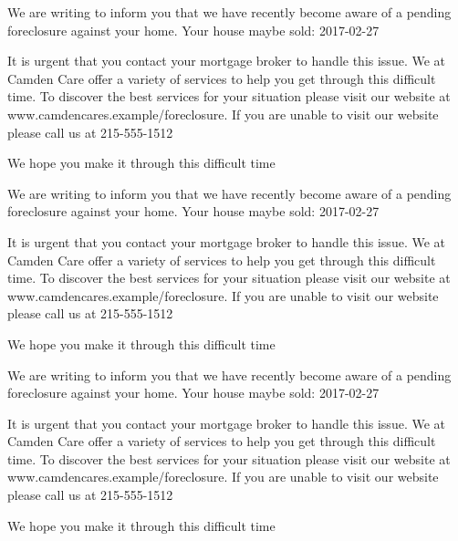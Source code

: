 \documentclass[10pt,stdletter]{newlfm}
\begin{document}
\pagebreak
{}
\begin{newlfm}

We are writing to inform you that we have recently become aware of a pending foreclosure against your home. Your house maybe sold: 2017-02-27

It is urgent that you contact your mortgage broker to handle this issue.
We at Camden Care offer a variety of services to help you get through this difficult time. To discover the best services for your situation please visit our website at www.camdencares.example/foreclosure.
If you are unable to visit our website please call us at 215-555-1512

We hope you make it through this difficult time

\end{newlfm}
\pagebreak
{}
\begin{newlfm}

We are writing to inform you that we have recently become aware of a pending foreclosure against your home. Your house maybe sold: 2017-02-27

It is urgent that you contact your mortgage broker to handle this issue.
We at Camden Care offer a variety of services to help you get through this difficult time. To discover the best services for your situation please visit our website at www.camdencares.example/foreclosure.
If you are unable to visit our website please call us at 215-555-1512

We hope you make it through this difficult time

\end{newlfm}
\pagebreak
{}
\begin{newlfm}

We are writing to inform you that we have recently become aware of a pending foreclosure against your home. Your house maybe sold: 2017-02-27

It is urgent that you contact your mortgage broker to handle this issue.
We at Camden Care offer a variety of services to help you get through this difficult time. To discover the best services for your situation please visit our website at www.camdencares.example/foreclosure.
If you are unable to visit our website please call us at 215-555-1512

We hope you make it through this difficult time

\end{newlfm}
\end{document}
